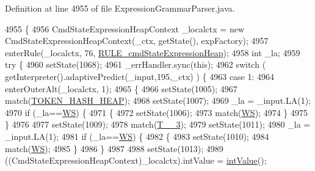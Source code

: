 Definition at line 4955 of file Expression\+Grammar\+Parser.\+java.


\begin{DoxyCode}
4955                                                                                                            
                         \{
4956     CmdStateExpressionHeapContext \_localctx = \textcolor{keyword}{new} CmdStateExpressionHeapContext(\_ctx, getState(), 
      expFactory);
4957     enterRule(\_localctx, 76, \hyperlink{classgov_1_1nasa_1_1jpf_1_1inspector_1_1server_1_1expression_1_1parser_1_1_expression_grammar_parser_a496c646278e4c226f6e9df4e60ae5780}{RULE\_cmdStateExpressionHeap});
4958     \textcolor{keywordtype}{int} \_la;
4959     \textcolor{keywordflow}{try} \{
4960       setState(1068);
4961       \_errHandler.sync(\textcolor{keyword}{this});
4962       \textcolor{keywordflow}{switch} ( getInterpreter().adaptivePredict(\_input,195,\_ctx) ) \{
4963       \textcolor{keywordflow}{case} 1:
4964         enterOuterAlt(\_localctx, 1);
4965         \{
4966         setState(1005);
4967         match(\hyperlink{classgov_1_1nasa_1_1jpf_1_1inspector_1_1server_1_1expression_1_1parser_1_1_expression_grammar_parser_a1da7bb4fec606d687fcf52dfb99fd2f2}{TOKEN\_HASH\_HEAP});
4968         setState(1007);
4969         \_la = \_input.LA(1);
4970         \textcolor{keywordflow}{if} (\_la==\hyperlink{classgov_1_1nasa_1_1jpf_1_1inspector_1_1server_1_1expression_1_1parser_1_1_expression_grammar_parser_ace44714ae633c7b14794cc5a24d9ebf3}{WS}) \{
4971           \{
4972           setState(1006);
4973           match(\hyperlink{classgov_1_1nasa_1_1jpf_1_1inspector_1_1server_1_1expression_1_1parser_1_1_expression_grammar_parser_ace44714ae633c7b14794cc5a24d9ebf3}{WS});
4974           \}
4975         \}
4976 
4977         setState(1009);
4978         match(\hyperlink{classgov_1_1nasa_1_1jpf_1_1inspector_1_1server_1_1expression_1_1parser_1_1_expression_grammar_parser_a68f9589dcc3fc777455467ff010385ea}{T\_\_3});
4979         setState(1011);
4980         \_la = \_input.LA(1);
4981         \textcolor{keywordflow}{if} (\_la==\hyperlink{classgov_1_1nasa_1_1jpf_1_1inspector_1_1server_1_1expression_1_1parser_1_1_expression_grammar_parser_ace44714ae633c7b14794cc5a24d9ebf3}{WS}) \{
4982           \{
4983           setState(1010);
4984           match(\hyperlink{classgov_1_1nasa_1_1jpf_1_1inspector_1_1server_1_1expression_1_1parser_1_1_expression_grammar_parser_ace44714ae633c7b14794cc5a24d9ebf3}{WS});
4985           \}
4986         \}
4987 
4988         setState(1013);
4989         ((CmdStateExpressionHeapContext)\_localctx).intValue = \hyperlink{classgov_1_1nasa_1_1jpf_1_1inspector_1_1server_1_1expression_1_1parser_1_1_expression_grammar_parser_a8c7e4b657a12e07efe3ea6429cb9cdcf}{intValue}();

\end{DoxyCode}
